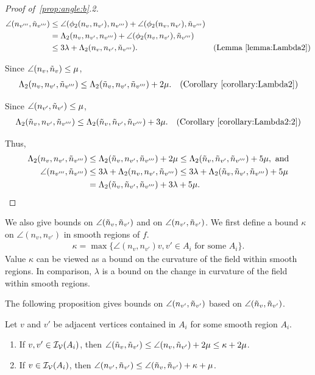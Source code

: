 \begin{proof}[Proof of~\ref{prop:angle:b}.2]

\begin{align*}
\angle(n_{v'''},\tilde{n}_{v'''}) 
  &  \le \angle(\phi_2(n_v, n_{v'}), n_{v'''}) 
         + \angle(\phi_2(n_v,n_{v'}), \tilde{n}_{v'''}) \\
  & = \Lambda_2(n_v, n_{v'}, n_{v'''}) 
      + \angle(\phi_2(n_v,n_{v'}), \tilde{n}_{v'''}) \\
  & \le 3 \lambda + \Lambda_2(n_v, n_{v'}, \tilde{n}_{v'''}).
  & \mbox{(Lemma~\ref{lemma:Lambda2})}
\end{align*}

Since $\angle(n_v,\tilde{n}_v) \le \mu$,
\begin{align*}
\Lambda_2(n_v, n_{v'}, \tilde{n}_{v'''}) 
  & \le \Lambda_2(\tilde{n}_v, n_{v'}, \tilde{n}_{v'''}) + 2\mu.
& \mbox{(Corollary~\ref{corollary:Lambda2})}
\end{align*}

Since $\angle(n_{v'},\tilde{n}_{v'}) \le \mu$,
\begin{align*}
\Lambda_2(\tilde{n}_v, n_{v'}, \tilde{n}_{v'''}) & 
\le \Lambda_2(\tilde{n}_v, \tilde{n}_{v'}, \tilde{n}_{v'''}) + 3\mu.
& \mbox{(Corollary~\ref{corollary:Lambda2:2})}
\end{align*}

Thus,
\begin{align*}
\Lambda_2(n_v, n_{v'}, \tilde{n}_{v'''}) 
   & \le \Lambda_2(\tilde{n}_v, n_{v'}, \tilde{n}_{v'''}) + 2\mu
\le \Lambda_2(\tilde{n}_v, \tilde{n}_{v'}, \tilde{n}_{v'''}) + 5\mu, \mbox{ and} \\
\angle(n_{v'''},\tilde{n}_{v'''}) & \le 3\lambda + \Lambda_2(n_v, n_{v'}, \tilde{n}_{v'''})
  \le 3\lambda + \Lambda_2(\tilde{n}_v, \tilde{n}_{v'}, \tilde{n}_{v'''}) + 5\mu \\
& = \Lambda_2(\tilde{n}_v, \tilde{n}_{v'}, \tilde{n}_{v'''}) + 3\lambda + 5 \mu.
\end{align*}

\end{proof}


We also give bounds on $\angle(\tilde{n}_v, \tilde{n}_{v'})$
and on  $\angle(n_{v'},\tilde{n}_{v'})$.
We first define a bound $\kappa$ on $\angle(n_v,n_{v'})$
in smooth regions of $f$.
\begin{align*}
\kappa = \max\{ \angle(n_v,n_{v'}) v,v' \in A_i \mbox{ for some } A_i \}.
\end{align*}
Value $\kappa$ can be viewed as a bound on the curvature of the field
within smooth regions.
In comparison, $\lambda$ is a bound on the change in curvature
of the field within smooth regions.

The following proposition gives bounds on $\angle(n_{v'},\tilde{n}_{v'})$
based on $\angle(\tilde{n}_v, \tilde{n}_{v'})$.
\begin{proposition}
Let $v$ and $v'$ be adjacent vertices contained in $A_i$
for some smooth region $A_i$.
\begin{enumerate}
\item If $v, v' \in \mathcal{I_V}(A_i)$, then
$\angle(\tilde{n}_v, \tilde{n}_{v'}) \le \angle(n_v, \tilde{n}_{v'}) + 2 \mu \le \kappa + 2 \mu$.
\item If $v \in \mathcal{I_V}(A_i)$, then
$\angle(n_{v'}, \tilde{n}_{v'}) \le \angle(\tilde{n}_v, \tilde{n}_{v'}) + \kappa + \mu$.
\end{enumerate}
\label{prop:kappa}
\end{proposition}

